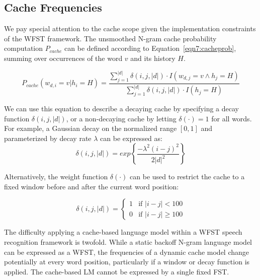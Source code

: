 \subsection{Cache Frequencies}

We pay special attention to the cache scope given the implementation constraints of the WFST framework.  The unsmoothed N-gram cache probability computation $P_{cache}$ can be defined according to Equation~\ref{eqn7:cacheprob}, summing over occurrences of the word $v$ and its history $H$.  

\begin{equation}
P_{cache}(w_{d,i}=v|h_i=H) = 
  \frac{\sum_{j=1}^{|d|} \delta(i,j,|d|)\cdot  I(w_{d,j}=v\land h_j=H)}{\sum_{j=1}^{|d|} \delta(i,j,|d|) \cdot I(h_{j}=H)} \label{eqn7:cacheprob}
\end{equation}

\noindent We can use this equation to describe a decaying cache by specifying a decay function $\delta(i,j,|d|)$, or a non-decaying cache by letting $\delta(\cdot)=1$ for all words.  For example, a Gaussian decay on the normalized range $[0,1]$ and parameterized by decay rate $\lambda$ can be expressed as:
\begin{equation}
\delta(i,j,|d|) = exp\left\{\frac{-\lambda^2(i-j)^2}{2|d|^2}\right\}
\end{equation}

\noindent Alternatively, the weight function $\delta(\cdot)$ can be used to restrict the cache to a fixed window before and after the current word position:

\begin{equation}
\delta(i,j,|d|) =
\left\{
	\begin{array}{ll}
		1  & \mbox{if } |i-j| < 100 \\
		0 & \mbox{if } |i-j| \geq 100
	\end{array}
\right.
\end{equation}

The difficulty applying a cache-based language model within a WFST speech recognition framework is twofold.  While a static backoff N-gram language model can be expressed as a WFST, the frequencies of a dynamic cache model change potentially at every word position, particularly if a window or decay function is applied.  The cache-based LM cannot be expressed by a single fixed FST.  

